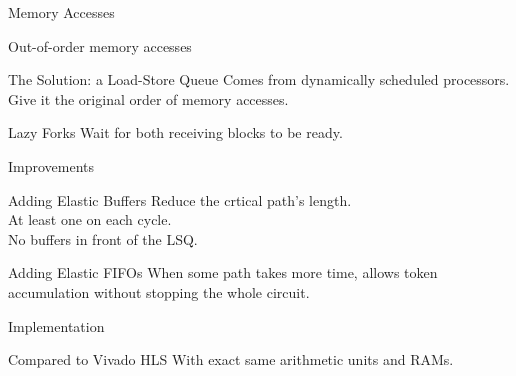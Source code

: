 \documentclass[page number]{beamer}
\begin{document}
\begin{frame}{Memory Accesses}
  \begin{alertblock}{Out-of-order memory accesses}
  \end{alertblock}
  \vfill
  \begin{exampleblock}{The Solution: a Load-Store Queue}
    Comes from dynamically scheduled processors.\\
    Give it the original order of memory accesses.
  \end{exampleblock}
  \vfill
  \begin{block}{Lazy Forks}
    Wait for both receiving blocks to be ready.
  \end{block}
    
\end{frame}

\begin{frame}{Improvements}
  \begin{block}{Adding Elastic Buffers}
    Reduce the crtical path's length.\\
    At least one on each cycle.\\
    No buffers in front of the LSQ.
  \end{block}
  \vfill
  \begin{block}{Adding Elastic FIFOs}
    When some path takes more time, allows token accumulation without stopping the whole circuit.
  \end{block}
\end{frame}

\begin{frame}{Implementation}
  \vfill
  \begin{block}{Compared to Vivado HLS}
    With exact same arithmetic units and RAMs.
  \end{block}
    
\end{frame}
\end{document}
